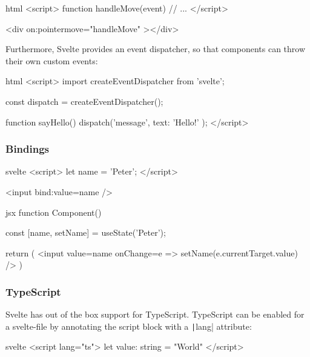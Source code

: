 \begin{myminted}[highlightlines={7}]{html}{}
<script>
  function handleMove(event) {
    // ...
  }
</script>

<div on:pointermove="{handleMove}" ></div>
\end{myminted}

Furthermore, Svelte provides an event dispatcher, so that components can throw their own custom events:

\begin{myminted}{html}{}
<script>
  import { createEventDispatcher } from 'svelte';

  const dispatch = createEventDispatcher();

  function sayHello() {
    dispatch('message', {
      text: 'Hello!'
    });
  }
</script>
\end{myminted}

\subsubsection{Bindings}



\begin{myminted}{svelte}{}
<script>
  let name = 'Peter';
</script>

<input bind:value={name} />
\end{myminted}

\begin{myminted}{jsx}{}
function Component() {
  const [name, setName] = useState('Peter');

  return (
    <input
      value={name}
      onChange={e => setName(e.currentTarget.value)}
    />
  )
}
\end{myminted}

\subsubsection{TypeScript}

Svelte has out of the box support for TypeScript. TypeScript can be enabled for a svelte-file by annotating the  script block with a \texttt|lang| attribute:

\begin{myminted}{svelte}{}
<script lang="ts">
  let value: string = "World"
</script>
\end{myminted}

